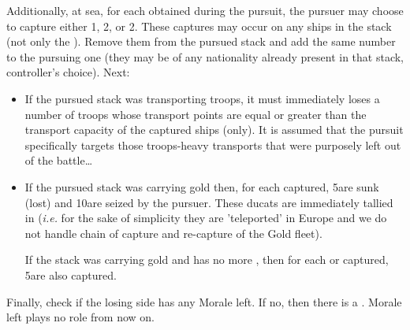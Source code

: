 Additionally, at sea, for each \textetoile obtained during the pursuit, the
pursuer may choose to capture either 1\NWD, 2\NGD, or 2\NTD. These captures
may occur on any ships in the stack (not only the ). Remove them from the pursued stack and add the same number to the
pursuing one (they may be of any nationality already present in that stack,
controller's choice). Next:
\begin{itemize}
\item If the pursued stack was transporting troops, it must immediately loses
  a number of troops whose transport points are equal or greater than the
  transport capacity of the captured ships (only). It is assumed that the
  pursuit specifically targets those troops-heavy transports that were
  purposely left out of the battle\ldots
\item If the pursued stack was carrying gold then, for each \NTD captured,
  5\ducats are sunk (lost) and 10\ducats are seized by the pursuer. These
  ducats are immediately tallied in  (\emph{i.e.} for the sake of simplicity they are 'teleported' in
  Europe and we do not handle chain of capture and re-capture of the Gold
  fleet).

  If the stack was carrying gold and has no more \NTD, then for each \NWD or
  \NGD captured, 5\ducats are also captured.
\end{itemize}

Finally, check if the losing side has any Morale left. If no, then there is a
. Morale left plays no role from now on.

